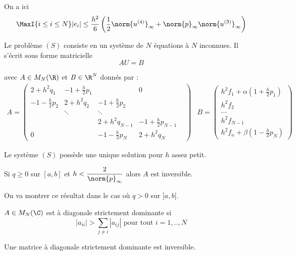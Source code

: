     \begin{remark}
        On a ici 
        \[
            \MaxI{i\leq i \leq N} |e_i| \leq \dfrac{h^2}{6} \left( \frac{1}{2}
            \norm{u^{(4)}}_\infty + \norm{p}_\infty \norm{u^{(3)}}_\infty \right)
        \]

        Le problème $(S)$ consiste en un système de $N$ équations à $N$ inconnues. Il s'écrit sous forme matricielle
        \[
            AU = B
        \]
        
        avec $A \in M_N(\R)$ et $B \in \R^N$ donnés par :
        \[
            \begin{array}{cc}
                A =
                \begin{pmatrix}
                    2 + h^2 q_1 & -1 + \frac{h}{2}p_1 & & 0\\
                    -1 - \frac{h}{2}p_2 & 2 + h^2 q_2 & -1 + \frac{h}{2}p_2 & \\
                    & \ddots & \ddots & & \\
                    & & 2 + h^2 q_{N-1} & -1 + \frac{h}{2}p_{N-1} \\
                    0 & & -1 - \frac{h}{2}p_N & 2 + h^2 q_N
                \end{pmatrix}
                &
                B =
                \begin{pmatrix}
                    h^2 f_1 + \alpha (1 + \frac{h}{2}p_1) \\
                    h^2 f_2 \\
                    \hdots \\
                    h^2 f_{N-1} \\
                    h^2 f_n + \beta (1 - \frac{h}{2} p_N)
                \end{pmatrix}
            \end{array}
        \]

        Le système $(S)$ possède une unique solution pour $h$ assez petit.
    \end{remark}

    \begin{ftheo}
        Si $q \geq 0$ sur $[a,b]$ et $h < \dfrac{2}{\norm{p}_\infty}$ alors
        $A$ est inversible.
    \end{ftheo}

On va montrer ce résultat dans le cas où $q > 0$ sur $]a,b[$.

    \begin{fdef}
        $A \in M_N(\C)$ est à diagonale strictement dominante si
        \[
            |a_{ii}| > \sum_{j \ne i} |a_{ij}| \text{ pour tout $i=1,..,N$}
        \]
    \end{fdef}

    \begin{ftheo}
        Une matrice à diagonale strictement dominante est inversible.
    \end{ftheo}


